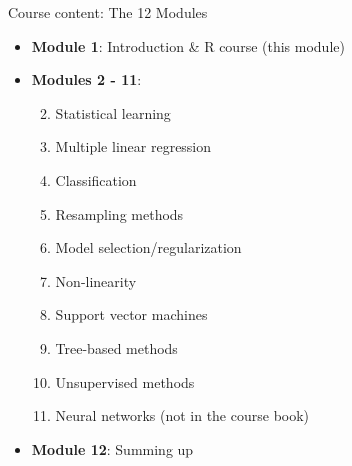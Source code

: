 \documentclass[10pt,ignorenonframetext,]{beamer}
\providecommand{\tightlist}{%
  \setlength{\itemsep}{0pt}\setlength{\parskip}{0pt}}
\begin{document}
\begin{frame}

\begin{block}{Course content: The 12 Modules}

\vspace{4mm}

\begin{itemize}
\tightlist
\item
  \textbf{Module 1}: Introduction \& R course (this module)
\end{itemize}

\vspace{2mm}

\begin{itemize}
\tightlist
\item
  \textbf{Modules 2 - 11}:

  \begin{enumerate}
  [1)]
  \setcounter{enumi}{1}
  \tightlist
  \item
    Statistical learning
  \item
    Multiple linear regression
  \item
    Classification
  \item
    Resampling methods
  \item
    Model selection/regularization
  \item
    Non-linearity
  \item
    Support vector machines
  \item
    Tree-based methods
  \item
    Unsupervised methods
  \item
    Neural networks (not in the course book)
  \end{enumerate}
\end{itemize}

\vspace{2mm}

\begin{itemize}
\tightlist
\item
  \textbf{Module 12}: Summing up
\end{itemize}

\end{block}

\end{frame}
\end{document}
